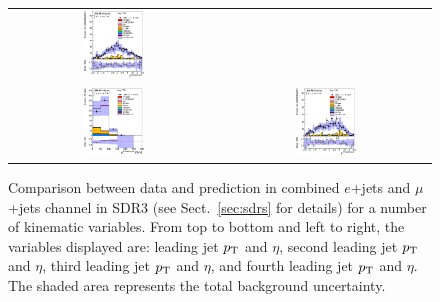 \begin{figure}[htbp]
\begin{center}
\begin{tabular}{cc}
\includegraphics[width=0.30\textwidth]{appendices/figures/sdrs/JetEta3_ELEMUONCR2_1W_NOMINAL.eps} \\
\includegraphics[width=0.30\textwidth]{appendices/figures/sdrs/JetPt4_ELEMUONCR2_1W_NOMINAL.eps}  &
\includegraphics[width=0.30\textwidth]{appendices/figures/sdrs/JetEta4_ELEMUONCR2_1W_NOMINAL.eps}  \\
\end{tabular}\caption{\small {Comparison between data and prediction in combined $e$+jets and $\mu$+jets channel in SDR3 (see Sect.~\ref{sec:sdrs} for details) 
for a number of kinematic variables. From top to bottom and left to right, the variables displayed are: leading jet $\pt$ and $\eta$,  second leading jet $\pt$ and $\eta$,
third leading jet $\pt$ and $\eta$, and fourth leading jet $\pt$ and $\eta$. The shaded area represents the total background uncertainty.}}
\label{fig:ELEMUONCR2_2}
\end{center}
\end{figure}                                                                             

